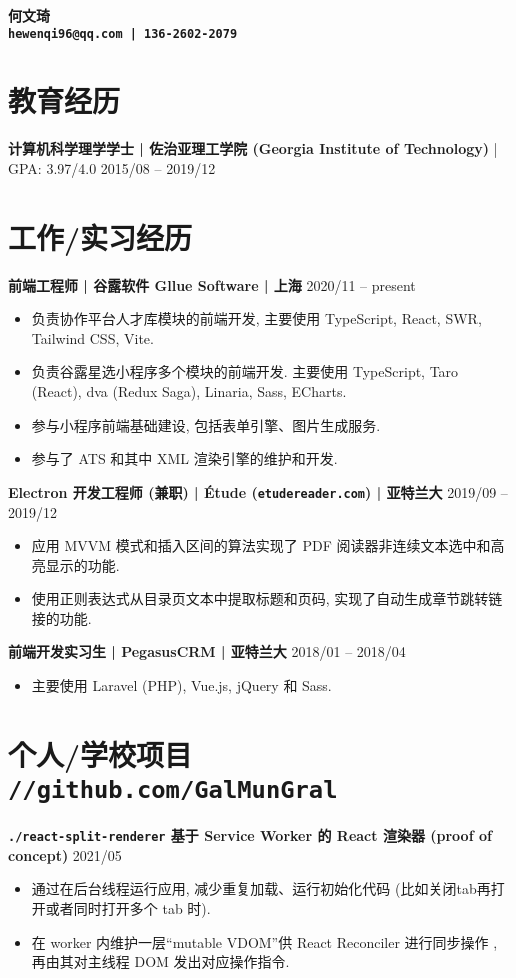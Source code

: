 \documentclass[10 pt]{article}
\begin{document}
\begin{center}
\textbf{\huge 何文琦}\\
\vspace{0.2em}
\textbf{\texttt{hewenqi96@qq.com | 136-2602-2079 }}
\end{center}

\section*{教育经历}
\textbf{计算机科学理学学士 | 佐治亚理工学院 (Georgia Institute of Technology)} | GPA: 3.97/4.0 \hfill 2015/08 -- 2019/12

\section*{工作/实习经历}
\textbf{前端工程师 | 谷露软件 Gllue Software | 上海} \hfill 2020/11 -- present
\begin{itemize}
\item 负责协作平台人才库模块的前端开发, 主要使用 TypeScript, React, SWR, Tailwind CSS, Vite.
\item 负责谷露星选小程序多个模块的前端开发. 主要使用 TypeScript, Taro (React), dva (Redux Saga), Linaria, Sass, ECharts.
\item 参与小程序前端基础建设, 包括表单引擎、图片生成服务.
\item 参与了 ATS 和其中 XML 渲染引擎的维护和开发.
\end{itemize}

\textbf{Electron 开发工程师 (兼职) | Étude (\texttt{etudereader.com}) | 亚特兰大} \hfill 2019/09 -- 2019/12
\begin{itemize}
\item 应用 MVVM 模式和插入区间的算法实现了 PDF 阅读器非连续文本选中和高亮显示的功能.
\item 使用正则表达式从目录页文本中提取标题和页码, 实现了自动生成章节跳转链接的功能.
\end{itemize}

\textbf{前端开发实习生 | PegasusCRM | 亚特兰大} \hfill 2018/01 -- 2018/04
\begin{itemize}
\item 主要使用 Laravel (PHP), Vue.js, jQuery 和 Sass.
\end{itemize} 

\section*{个人/学校项目 \texttt{\large //github.com/GalMunGral}}
\textbf{ \texttt{./react-split-renderer}  基于 Service Worker 的 React 渲染器 (proof of concept)} \hfill 2021/05 
\begin{itemize}
\item 通过在后台线程运行应用, 减少重复加载、运行初始化代码 (比如关闭tab再打开或者同时打开多个 tab 时).
\item  在 worker 内维护一层“mutable VDOM”供 React Reconciler 进行同步操作 , 再由其对主线程 DOM 发出对应操作指令.
\end{itemize}
\end{document}
